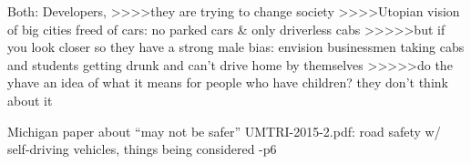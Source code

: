 Both:
Developers, >>>>they are trying to change society
>>>>Utopian vision of big cities freed of cars: no parked cars \& only
driverless cabs
>>>>>but if you look closer so they have a strong male bias: envision
businessmen taking cabs and students getting drunk and can't drive
home by themselves
>>>>>do the yhave an idea of what it means for people who have
children? they don't think about it

Michigan paper about ``may not be safer''
UMTRI-2015-2.pdf: road safety w/ self-driving vehicles, things being
considered
-p6

